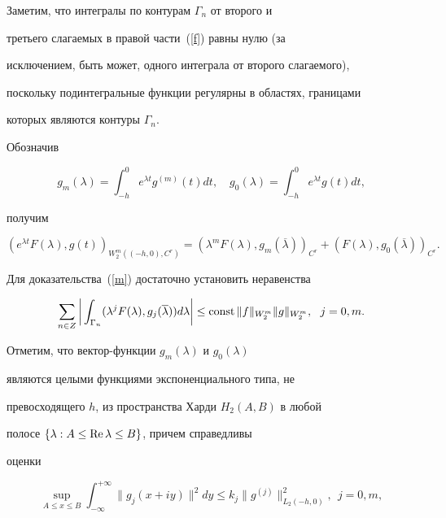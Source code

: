 Заметим, что интегралы по контурам $\Gamma_n$ от второго и


третьего слагаемых в правой части~(\ref{f}) равны нулю (за


исключением, быть может, одного интеграла от второго слагаемого),


поскольку подинтегральные функции регулярны в областях, границами


которых являются контуры $\Gamma_n$.





Обозначив


$$


g_m(\lambda)=\int_{-h}^0e^{\lambda t}g^{(m)}(t)dt,\quad


g_0(\lambda)=\int_{-h}^0e^{\lambda t}g(t)dt,


$$


получим


$$


(e^{\lambda t}F(\lambda),g(t))_{W_2^m((-h,0),C^r)}=(\lambda^mF(\lambda),


g_m(\overline{\lambda}))_{C^r}+(F(\lambda),g_0(\overline{\lambda}))_{C^r}.


$$





Для доказательства~(\ref{m}) достаточно установить неравенства


\begin{equation}


\label{qq}


\sum\limits_{n\in Z}\bigg|\int_{\Gamma_n}(\lambda^jF(\lambda),


g_j(\overline{\lambda}))d\lambda\bigg|\le \const\|f\|_{W_2^m}\|g\|_{W_2^m},


\ \ j=0,m.


\end{equation}


Отметим, что вектор-функции $g_m(\lambda)$ и $g_0(\lambda)$


являются целыми функциями экспоненциального типа, не


превосходящего $h$, из пространства Харди $H_2(A,B)$ в любой


полосе $\{\lambda:A\le \operatorname{Re}\lambda\le B\}$, причем справедливы


оценки


\begin{equation}


\label{n}


\sup\limits_{A\le x\le B}\int_{-\infty}^{+\infty}\|g_j(x+iy)\|^2dy


\le k_j\|g^{(j)}\|_{L_2(-h,0)}^2,\ \ j=0,m,


\end{equation}


